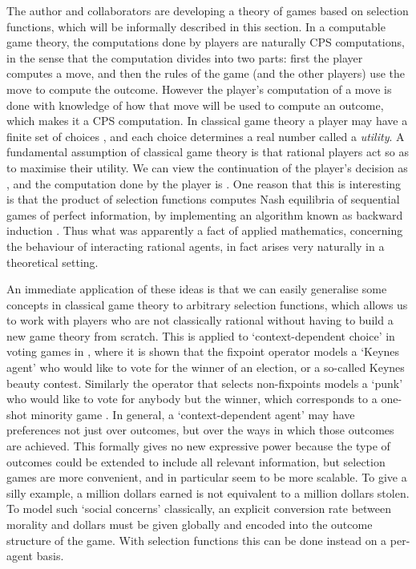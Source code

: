 \documentclass{article}
\begin{document}
The author and collaborators are developing a theory of games based on selection functions, which will be informally described in this section. In a computable game theory, the computations done by players are naturally CPS computations, in the sense that the computation divides into two parts: first the player computes a move, and then the rules of the game (and the other players) use the move to compute the outcome. However the player's computation of a move is done with knowledge of how that move will be used to compute an outcome, which makes it a CPS computation. In classical game theory a player may have a finite set of choices , and each choice determines a real number  called a \emph{utility}. A fundamental assumption of classical game theory is that rational players act so as to maximise their utility. We can view the continuation of the player's decision as , and the computation done by the player is . One reason that this is interesting is that the product of selection functions computes Nash equilibria of sequential games of perfect information, by implementing an algorithm known as backward induction \citep{escardo12}. Thus what was apparently a fact of applied mathematics, concerning the behaviour of interacting rational agents, in fact arises very naturally in a theoretical setting.

An immediate application of these ideas is that we can easily generalise some concepts in classical game theory to arbitrary selection functions, which allows us to work with players who are not classically rational without having to build a new game theory from scratch. This is applied to `context-dependent choice' in voting games in \citep{hedges14c}, where it is shown that the fixpoint operator  models a `Keynes agent' who would like to vote for the winner of an election, or a so-called Keynes beauty contest. Similarly the operator that selects non-fixpoints models a `punk' who would like to vote for anybody but the winner, which corresponds to a one-shot minority game \citep{kets11}. In general, a `context-dependent agent' may have preferences not just over outcomes, but over the ways in which those outcomes are achieved. This formally gives no new expressive power because the type of outcomes could be extended to include all relevant information, but selection games are more convenient, and in particular seem to be more scalable. To give a silly example, a million dollars earned is not equivalent to a million dollars stolen. To model such `social concerns' classically, an explicit conversion rate between morality and dollars must be given globally and encoded into the outcome structure of the game. With selection functions this can be done instead on a per-agent basis.
\end{document}
